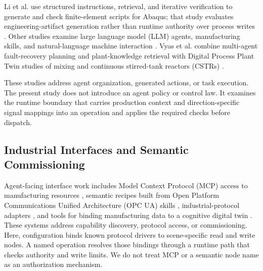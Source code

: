 \documentclass[journal]{IEEEtran}
\begin{document}
Li et al. use structured instructions, retrieval, and iterative verification to generate and check finite-element scripts for Abaqus; that study evaluates engineering-artifact generation rather than runtime authority over process writes \cite{li2026modsolagent}. Other studies examine large language model (LLM) agents, manufacturing skills, and natural-language machine interaction \cite{koehle2026llmdriven,lim2025llmenabled,zhao2026shopfloor,hofmann2025nlc}. Vyas et al. combine multi-agent fault-recovery planning and plant-knowledge retrieval with Digital Process Plant Twin studies of mixing and continuous stirred-tank reactors (CSTRs) \cite{vyas2026detection}.

These studies address agent organization, generated actions, or task execution. The present study does not introduce an agent policy or control law. It examines the runtime boundary that carries production context and direction-specific signal mappings into an operation and applies the required checks before dispatch.

\subsection{Industrial Interfaces and Semantic Commissioning}
Agent-facing interface work includes Model Context Protocol (MCP) access to manufacturing resources \cite{silva2025mcpmanufacturing}, semantic recipes built from Open Platform Communications Unified Architecture (OPC UA) skills \cite{koehle2025semanticrecipes}, industrial-protocol adapters \cite{xavier2026industriConnect}, and tools for binding manufacturing data to a cognitive digital twin \cite{liu2026semanticcommissioning}. These systems address capability discovery, protocol access, or commissioning. Here, configuration binds known protocol drivers to scene-specific read and write nodes. A named operation resolves those bindings through a runtime path that checks authority and write limits. We do not treat MCP or a semantic node name as an authorization mechanism.
\end{document}
